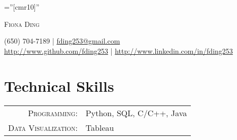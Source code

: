 \documentclass[letterpaper,10pt]{article}
\newif\ifgen
\newif\ifds
\newif\ifde
\newif\ifanalyst
\begin{document}

\pagestyle{empty} %

\font\fb=''[cmr10]'' %

\centering
{\Huge\textsc{Fiona Ding}} \par
{\small (650) 704-7189 | 
				\href{mailto:fding253@gmail.com}{fding253@gmail.com}}\\
{\small \href{http://www.github.com/fding253}
					{http://www.github.com/fding253}} | 
{\small \href{http://www.linkedin.com/in/fding253}
					{http://www.linkedin.com/in/fding253}}\par
\ifgen
	\emph{Fast learner with excellent problem-solving and analytical skills.}
\fi
\ifds
	\emph{Fast-learning data scientist with excellent problem-solving and analytical skills.}
\fi
\ifde
	\emph{Fast-learning data engineer with excellent problem-solving and analytical skills.}
\fi
\ifanalyst
	\emph{Fast-learning data analyst with excellent problem-solving and analytical skills.}
\fi




\section{Technical Skills}
\begin{tabular}{rp{11cm}}
 \textsc{Programming:}& Python, SQL, C/C++, Java \\ %
 \textsc{Data Visualization:}& Tableau \\
\end{tabular}
\end{document}
